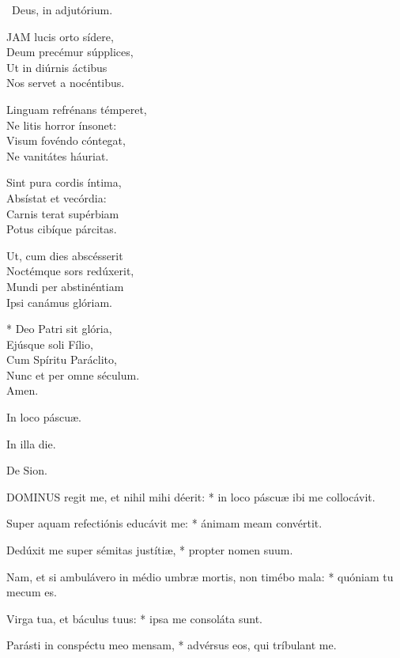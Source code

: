 \V\ Deus, in adjutórium.


\lettrine[lines=2]{J}{AM} lucis orto sídere,\\
Deum precémur súpplices,\\
Ut in diúrnis áctibus\\
Nos servet a nocéntibus.

Linguam refrénans témperet,\\
Ne litis horror ínsonet:\\
Visum fovéndo cóntegat,\\
Ne vanitátes háuriat.

Sint pura cordis íntima,\\
Absístat et vecórdia:\\
Carnis terat supérbiam\\
Potus cibíque párcitas.

Ut, cum dies abscésserit\\
Noctémque sors redúxerit,\\
Mundi per abstinéntiam\\
Ipsi canámus glóriam.

* Deo Patri sit glória,\\
Ejúsque soli Fílio,\\
Cum Spíritu Paráclito,\\
Nunc et per omne séculum.\\
Amen.

  In loco páscuæ.


  In illa die.

  De Sion.


\lettrine[lines=2]{D}{OMINUS} regit me, et nihil mihi déerit: * in loco páscuæ ibi me collocávit.

Super aquam refectiónis educávit me: * ánimam meam convértit.

Dedúxit me super sémitas justítiæ, * propter nomen suum.

Nam, et si ambulávero in médio umbræ mortis, non timébo mala: * quóniam tu mecum es.

Virga tua, et báculus tuus: * ipsa me consoláta sunt.

Parásti in conspéctu meo mensam, * advérsus eos, qui tríbulant me.

